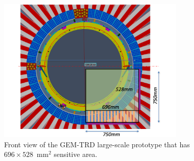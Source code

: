 \documentclass[%
preprint,
nofootinbib,
 amsmath,amssymb,
 aps,
floatfix,
]{revtex4-1}
\begin{document}
\begin{figure}[]
\includegraphics[width=0.80\textwidth]{./fig/GEM_TRD_prototype.pdf}
  \caption{
Front view of the GEM-TRD large-scale prototype
that has $696 \times 528$~mm$^2$ 
sensitive area. 
}
  \label{fig:proto}
\end{figure}
\end{document}
